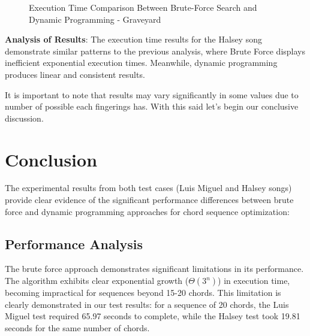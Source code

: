 \documentclass[conference]{IEEEtran}
\begin{document}
\begin{figure}[H]
    \centering
    \caption{Execution Time Comparison Between Brute-Force Search and Dynamic Programming - Graveyard}
    \label{fig:execution-time-graveyard}
\end{figure}
\textbf{Analysis of Results}: The execution time results for the Halsey song demonstrate similar patterns to the previous analysis, where Brute Force displays inefficient exponential execution times. Meanwhile, dynamic programming produces linear and consistent results. 

It is important to note that results may vary significantly in some values due to number of possible each fingerings has. With this said let's begin our conclusive discussion.


\section{Conclusion}
The experimental results from both test cases (Luis Miguel and Halsey songs) provide clear evidence of the significant performance differences between brute force and dynamic programming approaches for chord sequence optimization:

\subsection{Performance Analysis}

The brute force approach demonstrates significant limitations in its performance. The algorithm exhibits clear exponential growth (\(\Theta(3^n)\)) in execution time, becoming impractical for sequences beyond 15-20 chords. This limitation is clearly demonstrated in our test results: for a sequence of 20 chords, the Luis Miguel test required 65.97 seconds to complete, while the Halsey test took 19.81 seconds for the same number of chords.
    
\end{document}

